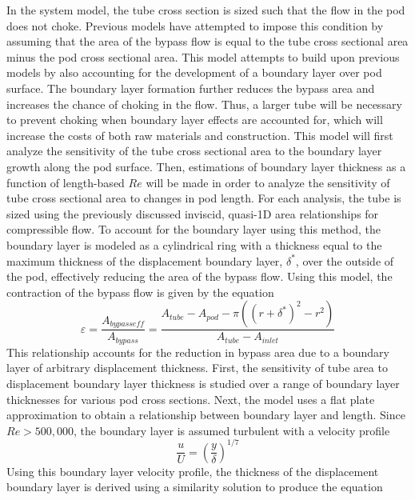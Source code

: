 In the system model, the tube cross section is sized such that the flow in the pod does not choke.
Previous models have attempted to impose this condition by assuming that the
area of the bypass flow is equal to the tube cross sectional area minus the
pod cross sectional area.\cite{Chin} This model attempts to build upon
previous models by also accounting for the development of a boundary layer over pod surface.
The boundary layer formation further reduces the bypass area and increases the
chance of choking in the flow. Thus, a larger tube will be necessary to prevent
choking when boundary layer effects are accounted for, which will increase the
costs of both raw materials and construction. This model will first analyze the
sensitivity of the tube cross sectional area to the boundary layer growth along
the pod surface. Then, estimations of boundary layer thickness as a function of
length-based $Re$ will be made in order to analyze the sensitivity of tube
cross sectional area to changes in pod length.
For each analysis, the tube is sized using the previously discussed inviscid,
quasi-1D area relationships for compressible flow. To account for the boundary
layer using this method, the boundary layer is modeled as a cylindrical ring
with a thickness equal to the maximum thickness of the displacement boundary layer,
$\delta^{*}$, over the outside of the pod, effectively reducing the area of the bypass flow.
Using this model, the contraction of the bypass flow is given by the equation
\begin{equation}
	\label{eq:epsilon}
	\varepsilon  = \frac{A_{bypass eff}}{A_{bypass}} = \frac{A_{tube}-A_{pod} -\pi  (  ( r+\delta ^{*}  )^{2}-r^{2}  )}{A_{tube}-A_{inlet}}
\end{equation}
This relationship accounts for the reduction in bypass area due to a boundary
layer of arbitrary displacement thickness. First, the sensitivity of tube area
to displacement boundary layer thickness is studied over a range of boundary
layer thicknesses for various pod cross sections. Next, the model uses a flat
plate approximation to obtain a relationship between boundary layer and length.
Since $Re > 500,000$, the boundary layer is assumed turbulent with a velocity profile \cite{FoxMcDonald}
\begin{equation}
	\label{eq:boundary_layer_profile}
	\frac{u}{U} = (\frac{y}{\delta })^{1/7}
\end{equation}
Using this boundary layer velocity profile, the thickness of the displacement
boundary layer is derived using a similarity solution to produce the equation \cite{FoxMcDonald}
